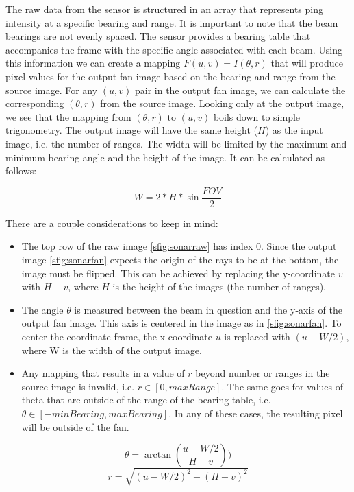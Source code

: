 The raw data from the sensor is structured in an array that represents ping intensity at a specific bearing and range. It is important to note that the beam bearings are not evenly spaced. The sensor provides a bearing table that accompanies the frame with the specific angle associated with each beam. Using this information we can create a mapping \(F(u,v)=I(\theta,r)\) that will produce pixel values for the output fan image based on the bearing and range from the source image. For any \((u,v)\) pair in the output fan image, we can calculate the corresponding \((\theta, r)\) from the source image. Looking only at the output image, we see that the mapping from \((\theta, r)\) to \((u, v)\) boils down to simple trigonometry. The output image will have the same height (\(H\)) as the input image, i.e. the number of ranges. The width will be limited by the maximum and minimum bearing angle and the height of the image. It can be calculated as follows: 

\begin{equation}
    W = 2 * H * \sin{\frac{FOV}{2}} 
\end{equation}

There are a couple considerations to keep in mind:
\begin{itemize}
    \item The top row of the raw image \ref{sfig:sonarraw} has index 0. Since the output image \ref{sfig:sonarfan} expects the origin of the rays to be at the bottom, the image must be flipped. This can be achieved by replacing the y-coordinate \(v\) with \(H - v\), where \(H\) is the height of the images (the number of ranges).
    \item The angle \(\theta\) is measured between the beam in question and the y-axis of the output fan image. This axis is centered in the image as in \ref{sfig:sonarfan}. To center the coordinate frame, the x-coordinate \(u\) is replaced with \((u - W / 2)\), where W is the width of the output image.
    \item Any mapping that results in a value of \(r\) beyond number or ranges in the source image is invalid, i.e. \(r \in [ 0, maxRange ]\). The same goes for values of theta that are outside of the range of the bearing table, i.e. \(\theta \in [ -minBearing, maxBearing] \). In any of these cases, the resulting pixel will be outside of the fan.
\end{itemize}


\[
\theta = \arctan(\frac{u - W / 2}{ H - v}))
\]
\[
r = \sqrt{(u - W / 2) ^ 2 + (H - v)^ 2}
\]

